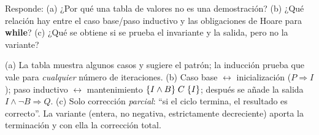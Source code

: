 \begin{prob}
Responde: (a) ¿Por qué una tabla de valores no es una demostración? (b) ¿Qué relación hay entre el caso base/paso inductivo y las obligaciones de Hoare para \textbf{while}? (c) ¿Qué se obtiene si se prueba el invariante y la salida, pero no la variante?
\end{prob}
\begin{sol}
(a) La tabla muestra algunos casos y sugiere el patrón; la inducción prueba que vale para \emph{cualquier} número de iteraciones.
(b) Caso base $\leftrightarrow$ inicialización ($P\Rightarrow I$); paso inductivo $\leftrightarrow$ mantenimiento $\{I\land B\}\;C\;\{I\}$; después se añade la salida $I\land\neg B\Rightarrow Q$.
(c) Solo corrección \emph{parcial}: ``si el ciclo termina, el resultado es correcto''. La variante (entera, no negativa, estrictamente decreciente) aporta la terminación y con ella la corrección total.
\end{sol}
